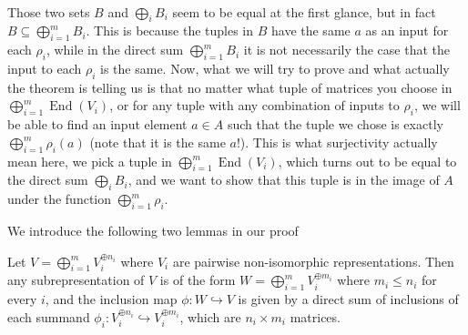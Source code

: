 \begin{note}
\\
Those two sets $B$ and $\bigoplus_i B_i$ seem to be equal at the first glance, but in fact $B \subseteq \bigoplus^m_{i=1} B_i$. This is because the tuples in $B$ have the same $a$ as an input for each $\rho_i$, while in the direct sum $\bigoplus^m_{i=1} B_i$ it is not necessarily the case that the input to each $\rho_i$ is the same.
Now, what we will try to prove and what actually the theorem is telling us is that no matter what tuple of matrices you choose in $\bigoplus_{i=1}^m \operatorname{End}(V_i)$, or for any tuple with any combination of inputs to $\rho_i$, we will be able to find an input element $a \in A$
 such that the tuple we chose is exactly $\displaystyle \bigoplus_{i=1}^m \rho_i(a)$ (note that it is the same $a$!).
  This is what surjectivity actually mean here, we pick a tuple in $\bigoplus_{i=1}^m \operatorname{End}(V_i)$, which turns out to be equal to the direct sum $\bigoplus_i B_i$,
   and we want to show that this tuple is in the image of $A$ under the function $\bigoplus_{i=1}^m \rho_i$.

\end{note}
 We introduce the following two lemmas in our proof
   \begin{lemma}
    \label{lemma 3.12}
    Let $V = \bigoplus_{i=1}^m V_i^{\oplus n_i}$ where $V_i$ are pairwise non-isomorphic representations. 
    Then any subrepresentation of $V$ is of the form $W = \bigoplus_{i=1}^m V_i^{\oplus m_i}$ where $m_i \leq n_i$ for every $i$, and the inclusion map $\phi: W \hookrightarrow V$ is given by  a direct sum of inclusions of each summand $\phi_i: V_i^{\oplus n_i} \hookrightarrow V_i^{\oplus m_i}$, which are $n_i \times m_i$ matrices.
 \end{lemma}

